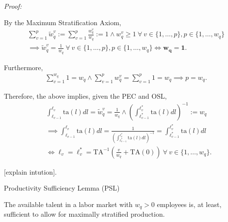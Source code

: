 \documentclass[hidelinks, nonatbib]{elsarticle}
\begin{document}
\begin{enumerate}
\textit{Proof:}

By the Maximum Stratification Axiom,
\begin{gather}
    \sum_{v=1}^{p}{
        \tilde{w}_{q}^{v}
    }
    :=
    \sum_{v=1}^{p}{
        \frac{
            w_{q}^{v}
        }{
            w_q
        }
    }
    := 1
    \land
    w_{q}^{v} 
    \geq 
    1
    \
    \forall
    \
    v \in \{1, \dots, p\},
    p \in \{1, \dots, w_q\}
    \\
    \implies
    \tilde{w}_{q}^{v} =
    \frac{1}{w_q}
    \
    \forall
    \
    v \in \{1, \dots, p\},
    p \in \{1, \dots, w_q\}
    \iff
    \boldsymbol{w_q} =
    \boldsymbol{1}
    .
\end{gather}

Furthermore,
\begin{gather}
    \sum_{v=1}^{w_q}
    1
    =
    w_q
    \land
    \sum_{v=1}^{p}{
        w_{q}^{v}
    }
    =
    \sum_{v=1}^{p}{
            1
    }
    = w_q
    \implies
    p = w_q
    .
\end{gather}

Therefore, the above implies, given the PEC and OSL,
\begin{align}
    &
    \int_{\ell_{v-1}}^{\ell_{v}}{
        \text{ta}(l)
        dl
    }
    =
    \tilde{w}_{q}^{v} =
    \frac{1}{w_q}
    \land
    \left(
        \int_{
            \ell_{v-1}^{*}
        }^{
            \ell_{v}^{*}    
        }{
            \text{ta}(l)
            dl
        }
    \right) ^ {-1}
    :=
    w_q
    \\
    &
    \implies
    \int_{\ell_{v-1}}^{\ell_{v}}{
        \text{ta}(l)
        dl
    }
    =
    \frac{1}{
        \left(
            \int_{
                \ell_{v-1}^{*}
            }^{
                \ell_{v}^{*}    
            }{
                \text{ta}(l)
                dl
            }
        \right) ^ {-1}
    }
    =
    \int_{
        \ell_{v-1}^{*}
    }^{
        \ell_{v}^{*}    
    }{
        \text{ta}(l)
        dl
    }
    \\
    &
    \iff
    \ell_{v}
    =
    \ell_{v}^{*}
    =
    \text{TA}^{-1}\left(
        \frac{v}{w_q}
        +
        \text{TA}(0)
    \right)
    \
    \forall
    \
    v \in \{1, \dots, w_q\}
    .
\end{align}

[explain intution].

Productivity Sufficiency Lemma (PSL)

The available talent in a labor market with $w_q > 0$ employees is, at least, sufficient to allow for maximally stratified production.


\end{enumerate}
\end{document}
